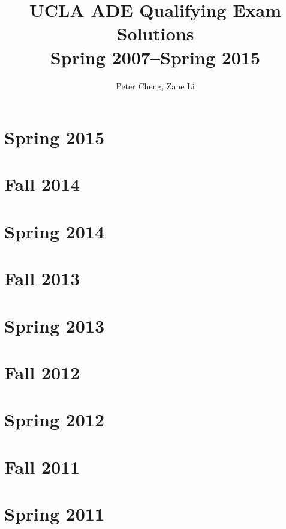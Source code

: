 \documentclass[12pt]{article}
\title{UCLA ADE Qualifying Exam Solutions\\Spring 2007--Spring 2015}
\author{Peter Cheng, Zane Li}
\date{}
\begin{document}
\maketitle

\newpage




\newpage

\tableofcontents

\newpage

\section{Spring 2015}\label{s15}


\section{Fall 2014}\label{f14}


\section{Spring 2014}\label{s14}


\section{Fall 2013}\label{f13}


\section{Spring 2013}\label{s13}


\section{Fall 2012}\label{f12}


\section{Spring 2012}\label{s12}


\section{Fall 2011}\label{f11}


\section{Spring 2011}\label{s11}

\end{document}
